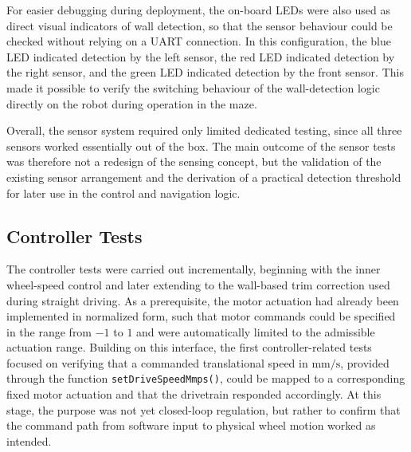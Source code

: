 For easier debugging during deployment, the on-board LEDs were also used as direct visual indicators of wall detection, so that the sensor behaviour could be checked without relying on a UART connection. In this configuration, the blue LED indicated detection by the left sensor, the red LED indicated detection by the right sensor, and the green LED indicated detection by the front sensor. This made it possible to verify the switching behaviour of the wall-detection logic directly on the robot during operation in the maze.

Overall, the sensor system required only limited dedicated testing, since all three sensors worked essentially out of the box. The main outcome of the sensor tests was therefore not a redesign of the sensing concept, but the validation of the existing sensor arrangement and the derivation of a practical detection threshold for later use in the control and navigation logic.

\subsection{Controller Tests}

The controller tests were carried out incrementally, beginning with the inner wheel-speed control and later extending to the wall-based trim correction used during straight driving. As a prerequisite, the motor actuation had already been implemented in normalized form, such that motor commands could be specified in the range from $-1$ to $1$ and were automatically limited to the admissible actuation range. Building on this interface, the first controller-related tests focused on verifying that a commanded translational speed in $\mathrm{mm/s}$, provided through the function \texttt{setDriveSpeedMmps()}, could be mapped to a corresponding fixed motor actuation and that the drivetrain responded accordingly. At this stage, the purpose was not yet closed-loop regulation, but rather to confirm that the command path from software input to physical wheel motion worked as intended.

